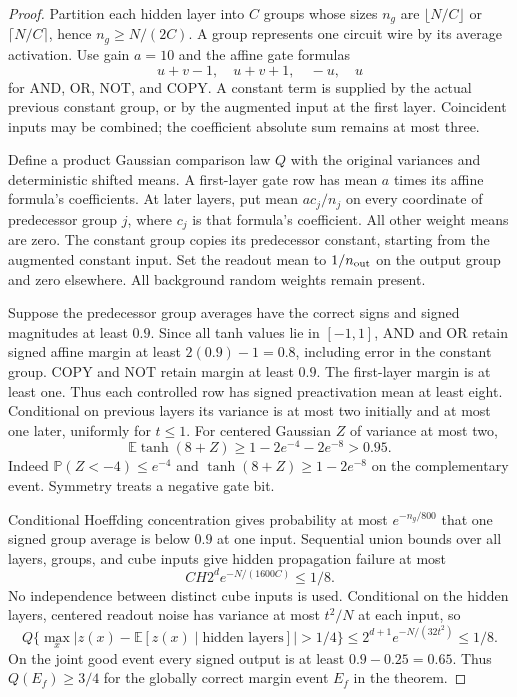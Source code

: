 \documentclass[11pt]{article}
\theoremstyle{remark}\newtheorem{remark}[theorem]{Remark}
\newcommand{\E}{\mathbb E}
\newcommand{\Prb}{\mathbb P}
\begin{document}
\begin{proof}
Partition each hidden layer into $C$ groups whose sizes $n_g$
are $\lfloor N/C\rfloor$ or $\lceil N/C\rceil$, hence
$n_g\ge N/(2C)$. A group represents one circuit wire by its
average activation. Use gain $a=10$ and the affine gate formulas
\[
 u+v-1,\quad u+v+1,\quad -u,\quad u
\]
for AND, OR, NOT, and COPY. A constant term is supplied by the
actual previous constant group, or by the augmented input at the
first layer. Coincident inputs may be combined; the coefficient
absolute sum remains at most three.

Define a product Gaussian comparison law $Q$ with the original
variances and deterministic shifted means. A first-layer gate row
has mean $a$ times its affine formula's coefficients. At later
layers, put mean $ac_j/n_j$ on every coordinate of predecessor
group $j$, where $c_j$ is that formula's coefficient. All other
weight means are zero. The constant group copies its predecessor
constant, starting from the augmented constant input. Set the
readout mean to $1/n_{\rm out}$ on the output group and zero
elsewhere. All background random weights remain present.

Suppose the predecessor group averages have the correct signs
and signed magnitudes at least $0.9$. Since all tanh values lie
in $[-1,1]$, AND and OR retain signed affine margin at least
$2(0.9)-1=0.8$, including error in the constant group. COPY and
NOT retain margin at least $0.9$. The first-layer margin is at
least one. Thus each controlled row has signed preactivation
mean at least eight. Conditional on previous layers its variance
is at most two initially and at most one later, uniformly for
$t\le1$. For centered Gaussian $Z$ of variance at most two,
\[
 \E\tanh(8+Z)\ge1-2e^{-4}-2e^{-8}>0.95.
\]
Indeed $\Prb(Z<-4)\le e^{-4}$ and $\tanh(8+Z)\ge1-2e^{-8}$
on the complementary event. Symmetry treats a negative gate bit.

Conditional Hoeffding concentration gives probability at most
$e^{-n_g/800}$ that one signed group average is below $0.9$ at
one input. Sequential union bounds over all layers, groups, and
cube inputs give hidden propagation failure at most
\[
 CH2^d e^{-N/(1600C)}\le1/8.
\]
No independence between distinct cube inputs is used. Conditional
on the hidden layers, centered readout noise has variance at most
$t^2/N$ at each input, so
\[
 Q\{\max_x|z(x)-\E[z(x)\mid\text{hidden layers}]|>1/4\}
 \le2^{d+1}e^{-N/(32t^2)}\le1/8.
\]
On the joint good event every signed output is at least
$0.9-0.25=0.65$. Thus $Q(E_f)\ge3/4$ for the globally correct
margin event $E_f$ in the theorem.


\end{proof}
\end{document}
